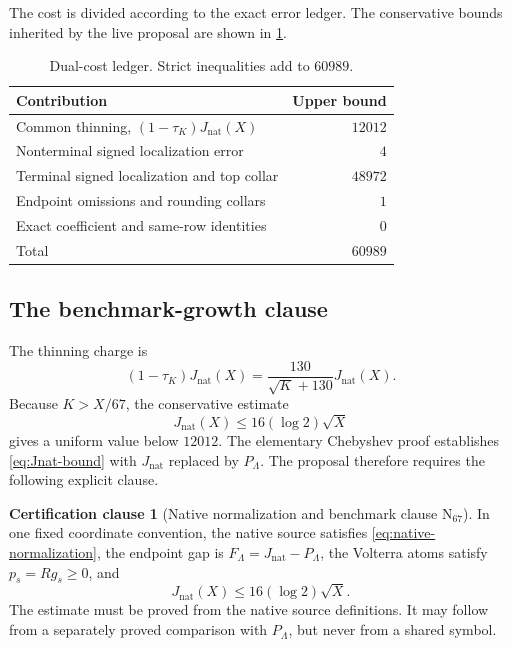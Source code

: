 \documentclass[11pt]{article}
\theoremstyle{definition}
\newtheorem{assumption}[theorem]{Certification clause}
\theoremstyle{remark}
\newcommand{\1}{\mathbf 1}
\newcommand{\Nat}{\mathrm{nat}}
\begin{document}
The cost is divided according to the exact error ledger.  The conservative bounds inherited by the live proposal are shown in \cref{tab:cost}.

\begin{table}[ht]
\centering
\caption{Dual-cost ledger.  Strict inequalities add to \(60989\).}\label{tab:cost}
\begin{tabularx}{0.88\textwidth}{@{}Xr@{}}
\toprule
Contribution & Upper bound\\
\midrule
Common thinning, \((1-\tau_K)J_{\Nat}(X)\) & \(12012\)\\
Nonterminal signed localization error & \(4\)\\
Terminal signed localization and top collar & \(48972\)\\
Endpoint omissions and rounding collars & \(1\)\\
Exact coefficient and same-row identities & \(0\)\\
\midrule
Total & \(60989\)\\
\bottomrule
\end{tabularx}
\end{table}

\subsection{The benchmark-growth clause}

The thinning charge is
\begin{equation}\label{eq:thin-charge}
(1-\tau_K)J_{\Nat}(X)
=\frac{130}{\sqrt K+130}J_{\Nat}(X).
\end{equation}
Because \(K> X/67\), the conservative estimate
\begin{equation}\label{eq:Jnat-bound}
J_{\Nat}(X)\le 16(\log2)\sqrt X
\end{equation}
gives a uniform value below \(12012\).  The elementary Chebyshev proof establishes \eqref{eq:Jnat-bound} with \(J_{\Nat}\) replaced by \(P_\Lambda\).  The proposal therefore requires the following explicit clause.

\begin{assumption}[Native normalization and benchmark clause \(\mathrm N_{67}\)]\label{ass:N67}
In one fixed coordinate convention, the native source satisfies \eqref{eq:native-normalization}, the endpoint gap is \(F_\Lambda=J_{\Nat}-P_\Lambda\), the Volterra atoms satisfy \(p_s=Rg_s\ge0\), and
\begin{equation}\label{eq:N67-options}
J_{\Nat}(X)\le 16(\log2)\sqrt X.
\end{equation}
The estimate must be proved from the native source definitions.  It may follow from a separately proved comparison with \(P_\Lambda\), but never from a shared symbol.
\end{assumption}
\end{document}
